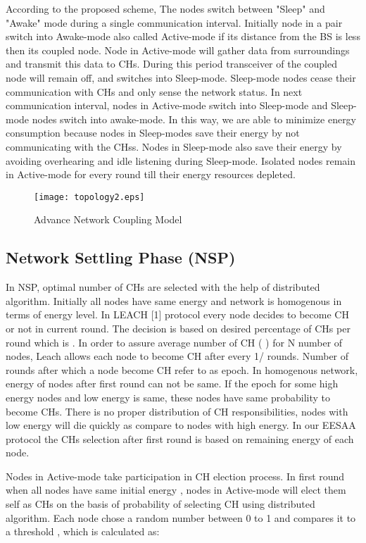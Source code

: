 \documentclass[journal]{IEEEtran}
\begin{document}
According to the proposed scheme, The nodes switch between "Sleep" and "Awake" mode during a single communication interval. Initially node in a pair switch into Awake-mode also called Active-mode if its distance from the BS is less then its coupled node. Node in Active-mode will gather data from surroundings and transmit this data to CHs. During this period transceiver of the coupled node will remain off, and switches into Sleep-mode. Sleep-mode nodes cease their communication with CHs and only sense the network status. In next communication interval,  nodes in Active-mode switch into Sleep-mode and Sleep-mode nodes switch into awake-mode. In this way, we are able to minimize energy consumption because nodes in Sleep-modes save their energy by not communicating with the CHss. Nodes in Sleep-mode also save their energy by avoiding overhearing and idle listening during Sleep-mode. Isolated nodes remain in Active-mode for every round till their energy resources depleted.

\begin{figure*}[t]
\centering
\texttt{[image: topology2.eps]}
\caption{Advance Network Coupling Model}\label{Figure 1}
\end{figure*}

\subsection{Network Settling Phase (NSP)}
In NSP, optimal number of CHs are selected with the help of distributed algorithm. Initially all nodes have same energy and network is homogenous in terms of energy level. In LEACH [1] protocol every node decides to become CH or not in current round. The decision is based on desired percentage of CHs per round which is . In order to assure average number of CH (  ) for N number of nodes, Leach allows each node to become CH after every 1/ rounds. Number of rounds after which a node become CH refer to as epoch. In homogenous network, energy of nodes after first round can not be same. If the epoch for some high energy nodes and low energy is same, these nodes have same probability to become CHs. There is no proper distribution of CH responsibilities, nodes with low energy will die quickly as compare to nodes with high energy. In our EESAA protocol the CHs selection after first round is based on remaining energy of each node.

Nodes in Active-mode take participation in CH election process. In first round when all nodes have same initial energy  , nodes in Active-mode will elect them self as CHs on the basis of probability of selecting CH using distributed algorithm. Each node chose a random number between 0 to 1 and compares it to a threshold , which is calculated as:
\end{document}

